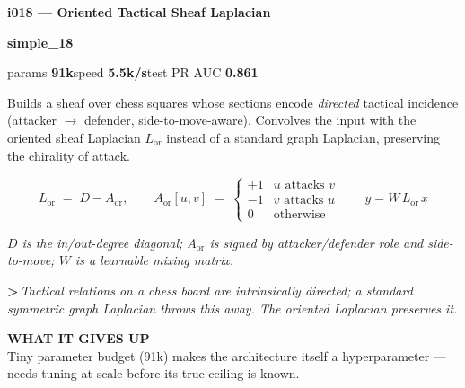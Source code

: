 \documentclass[10pt,a4paper]{article}
\newcommand{\pillsi}[0]{\colorbox{s18redbg}{\strut\textcolor{s18red}{\scriptsize\bfseries\sffamily simple\_18}}}
\begin{document}
\begin{tcolorbox}
\begin{tcolorbox}[archhead, boxsep=0pt, top=4pt, bottom=4pt]
\textcolor{deepforest}{\sffamily\bfseries\large i018 --- Oriented Tactical Sheaf Laplacian}\\[2pt]
\textcolor{muted}{\sffamily\scriptsize \pillsi{}\quad params \textbf{91k}\quad speed \textbf{5.5k/s}\quad test PR AUC \textbf{0.861}}
\end{tcolorbox}
\smallskip
Builds a sheaf over chess squares whose sections encode \emph{directed} tactical incidence (attacker $\to$ defender, side-to-move-aware). Convolves the input with the oriented sheaf Laplacian $L_{\mathrm{or}}$ instead of a standard graph Laplacian, preserving the chirality of attack.
\par\smallskip
\begin{equation*}
L_{\mathrm{or}} \;=\; D - A_{\mathrm{or}}, \qquad A_{\mathrm{or}}[u,v] \;=\; \begin{cases} +1 & u \text{ attacks } v \\ -1 & v \text{ attacks } u \\ 0 & \text{otherwise}\end{cases}\qquad y = W \, L_{\mathrm{or}}\, x
\end{equation*}
\par\vspace{-4pt}\begin{center}\textit{\textcolor{muted}{\small $D$ is the in/out-degree diagonal; $A_{\mathrm{or}}$ is signed by attacker/defender role and side-to-move; $W$ is a learnable mixing matrix.}}\end{center}
\par\smallskip
{\color{forest}\sffamily\bfseries\textgreater\,}\textit{Tactical relations on a chess board are intrinsically directed; a standard symmetric graph Laplacian throws this away. The oriented Laplacian preserves it.}
\par\smallskip\textbf{\sffamily\footnotesize\color{muted}WHAT IT GIVES UP}\\
Tiny parameter budget (91k) makes the architecture itself a hyperparameter --- needs tuning at scale before its true ceiling is known.
\end{tcolorbox}
\end{document}
